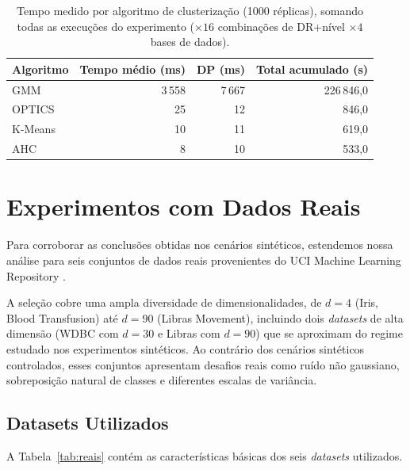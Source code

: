 \documentclass[12pt,a4paper]{report}
\begin{document}
\begin{table}[ht]
  \centering
  \caption{Tempo medido por algoritmo de clusterização (1000 réplicas),
    somando todas as execuções do experimento ($\times 16$ combinações de
    DR+nível $\times 4$ bases de dados).}
  \label{tab:tempo_algo}
  \begin{tabular}{lrrr}
    \toprule
    Algoritmo & Tempo médio (ms) & DP (ms) & Total acumulado (s) \\
    \midrule
    GMM       & 3\,558 & 7\,667 & 226\,846{,}0 \\
    OPTICS    &    25  &    12  &     846{,}0  \\
    K-Means   &    10  &    11  &     619{,}0  \\
    AHC       &     8  &    10  &     533{,}0  \\
    \bottomrule
  \end{tabular}
\end{table}

\chapter{Experimentos com Dados Reais}
\label{chap:reais}

Para corroborar as conclusões obtidas nos cenários sintéticos, estendemos
nossa análise para seis conjuntos de dados reais provenientes do UCI Machine
Learning Repository \citep{uci2019}.

A seleção cobre uma ampla diversidade de dimensionalidades, de $d=4$ (Iris,
Blood Transfusion) até $d=90$ (Libras Movement), incluindo dois
\textit{datasets} de alta dimensão (WDBC com $d=30$ e Libras com $d=90$)
que se aproximam do regime estudado nos experimentos sintéticos. Ao contrário
dos cenários sintéticos controlados, esses conjuntos apresentam desafios
reais como ruído não gaussiano, sobreposição natural de classes e diferentes
escalas de variância.

\section{Datasets Utilizados}

A Tabela~\ref{tab:reais} contém as características básicas dos seis
\textit{datasets} utilizados.
\end{document}
